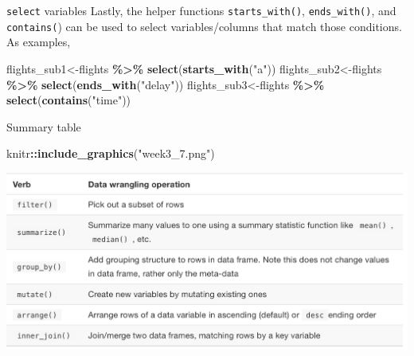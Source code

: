 \documentclass[
  ignorenonframetext,
]{beamer}
\newenvironment{Shaded}{\begin{snugshade}}{\end{snugshade}}
\newcommand{\FunctionTok}[1]{\textcolor[rgb]{0.13,0.29,0.53}{\textbf{#1}}}
\newcommand{\NormalTok}[1]{#1}
\newcommand{\OtherTok}[1]{\textcolor[rgb]{0.56,0.35,0.01}{#1}}
\newcommand{\SpecialCharTok}[1]{\textcolor[rgb]{0.81,0.36,0.00}{\textbf{#1}}}
\newcommand{\StringTok}[1]{\textcolor[rgb]{0.31,0.60,0.02}{#1}}
\begin{document}
\begin{frame}[fragile]{\texttt{select} variables}
\protect\hypertarget{select-variables-4}{}
Lastly, the helper functions \texttt{starts\_with()},
\texttt{ends\_with()}, and \texttt{contains(}) can be used to select
variables/columns that match those conditions. As examples,

\tiny

\begin{Shaded}
\begin{Highlighting}[]
\NormalTok{flights\_sub1}\OtherTok{\textless{}{-}}\NormalTok{flights }\SpecialCharTok{\%\textgreater{}\%} \FunctionTok{select}\NormalTok{(}\FunctionTok{starts\_with}\NormalTok{(}\StringTok{"a"}\NormalTok{))}
\NormalTok{flights\_sub2}\OtherTok{\textless{}{-}}\NormalTok{flights }\SpecialCharTok{\%\textgreater{}\%} \FunctionTok{select}\NormalTok{(}\FunctionTok{ends\_with}\NormalTok{(}\StringTok{"delay"}\NormalTok{))}
\NormalTok{flights\_sub3}\OtherTok{\textless{}{-}}\NormalTok{flights }\SpecialCharTok{\%\textgreater{}\%} \FunctionTok{select}\NormalTok{(}\FunctionTok{contains}\NormalTok{(}\StringTok{"time"}\NormalTok{))}
\end{Highlighting}
\end{Shaded}

\normalsize
\end{frame}

\begin{frame}[fragile]{Summary table}
\protect\hypertarget{summary-table}{}
\begin{Shaded}
\begin{Highlighting}[]
\NormalTok{knitr}\SpecialCharTok{::}\FunctionTok{include\_graphics}\NormalTok{(}\StringTok{"week3\_7.png"}\NormalTok{)}
\end{Highlighting}
\end{Shaded}

\begin{center}\includegraphics[width=0.8\linewidth,height=0.6\textheight]{week3_7} \end{center}
\end{frame}
\end{document}
